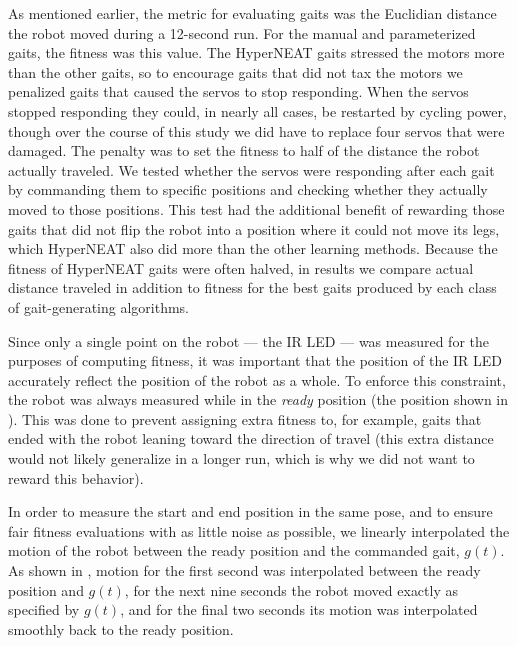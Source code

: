 As mentioned earlier, the metric for evaluating gaits was the Euclidian distance the robot
moved during a 12-second run. For the manual and parameterized gaits,
the fitness was this value. The HyperNEAT gaits stressed the motors
more than the other gaits, so to encourage gaits that did not tax the
motors we penalized gaits that caused the servos to stop
responding. When the servos stopped responding they could, in nearly
all cases, be restarted by cycling power, though over the course of
this study we did have to replace four servos that were damaged.
The penalty was to set the fitness to half of the distance
the robot actually traveled. We tested whether the servos were
responding after each gait by commanding them to specific positions
and checking whether they actually moved to those positions. This test
had the additional benefit of rewarding those gaits that did not flip
the robot into a position where it could not move its legs, which
HyperNEAT also did more than the other learning methods. Because the
fitness of HyperNEAT gaits were often halved, in results we compare
actual distance traveled in addition to fitness for the best gaits
produced by each class of gait-generating algorithms.

Since only a single point on the robot --- the IR LED --- was measured
for the purposes of computing fitness, it was important that the
position of the IR LED accurately reflect the position of the robot as
a whole.  To enforce this constraint, the robot was always measured
while in the \emph{ready} position (the position shown in
).  This was done to prevent assigning extra
fitness to, for example, gaits that ended with the robot leaning toward
the direction of travel (this extra distance would not likely generalize
in a longer run, which is why we did not want to reward this behavior).

In order to measure the start and end position in the same pose, and to ensure fair fitness evaluations with as little noise as possible, we
linearly interpolated the motion of the robot between the ready
position and the commanded gait, $g(t)$.  As shown in
, motion for the first second was interpolated
between the ready position and $g(t)$, for the next nine seconds the
robot moved exactly as specified by $g(t)$, and for the final two
seconds its motion was interpolated smoothly back to the ready
position.



